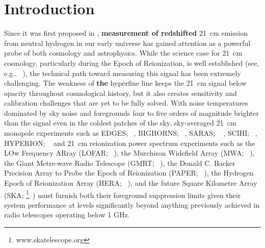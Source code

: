 \documentclass[twocolumn]{emulateapj}
\begin{document}
    
    \section{\textbf{Introduction}}
    
    Since it was first proposed in \cite{1997ApJ...475..429M, Shaver_et_al1999}, \textbf{measurement of redshifted} 21~cm
    emission from neutral hydrogen in our early universe has gained attention as a
    powerful probe of both cosmology and astrophysics.  While the science case for
    21~cm cosmology, particularly during the Epoch of Reionization, is well
    established (see, e.g.,
    ~\cite{furlanetto_et_al2006, morales_wyithe2010, pritchard_loeb2012}),
    the technical path toward measuring this signal has been extremely challenging.  The
    weakness of \textbf{the} hyperfine line keeps the 21~cm signal below opacity throughout
    cosmological history, but it also creates sensitivity and calibration
    challenges that are yet to be fully solved.  With noise temperatures dominated
    by sky noise and foregrounds four to five orders of magnitude
    brighter than the signal even in the coldest patches of the sky, 
    sky-averaged 21~cm monopole experiments such as
    EDGES; ~\citep{Bowman_et_al2010},
    BIGHORNS; ~\citealt{2015PhDT........65V},
    SARAS; ~\citep{Patra_et_al2015, Patra_et_al2013} ,
    SCIHI; ~\citep{2015PhDT........65V},
    HYPERION; ~\citep{presley_et_al2015}
    and 21~cm reionization power spectrum experiments such as
    the LOw Frequency ARray (LOFAR; ~\citealt{van_Haarlem_2013}),
    the Murchison Widefield Array (MWA; ~\citealt{Tingay_2013}),
    the Giant Metre-wave Radio Telescope (GMRT; ~\citealt{Paciga_et_al2011}),
    the Donald C. Backer Precision Array to Probe the Epoch of Reionization (PAPER; ~\citealt{parsons_et_al2010}),
    the Hydrogen Epoch of Reionization Array (HERA; ~\citealt{deBoer_2016}),
    and the future Square Kilometre Array (SKA; \footnote{www.skatelescope.org}~\citealt{2013ExA....36..235M})
    must furnish both their foreground suppression limits given their system performance at levels significantly
    beyond anything previously achieved in radio telescopes operating below 1 GHz.
    
\end{document}
